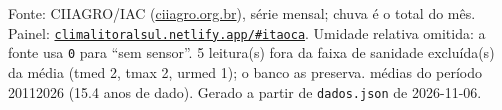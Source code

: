 \documentclass[10pt,a4paper]{article}
\begin{document}
\vspace{1pt}
{\tiny\color{cinza}
Fonte: CIIAGRO/IAC (\href{http://ciiagro.org.br}{ciiagro.org.br}), série mensal;
chuva é o total do mês. Painel:
\href{https://climalitoralsul.netlify.app/\#itaoca}%
{\texttt{climalitoralsul.netlify.app/\#itaoca}}.
Umidade relativa omitida: a fonte usa \texttt{0} para ``sem sensor''.  5 leitura(s) fora da faixa de sanidade excluída(s) da média (tmed 2, tmax 2, urmed 1); o banco as preserva.
médias do período 2011\textendash{}2026 (15.4 anos de dado).
Gerado a partir de \texttt{dados.json} de 2026-11-06.}
\end{document}
